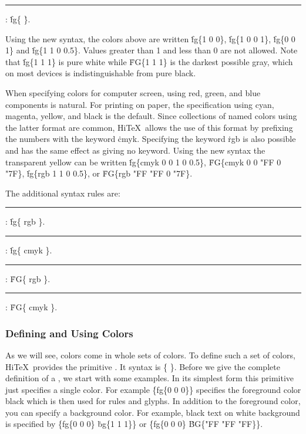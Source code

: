 \medskip
\rule{}:
\.{fg\{}     \.{\}}.
\medskip

Using the new syntax, the colors above are written
\.{fg\{1 0 0\}}, \.{fg\{1 0 0 1\}},
\.{fg\{0 0 1\}} and \.{fg\{1 1 0 0.5\}}.
Values greater than 1 and less than 0 are not allowed.
Note that \.{fg\{1 1 1\}} is pure white while  \.{FG\{1 1 1\}} is
the darkest possible gray, which on most devices is indistinguishable
from pure black.

When specifying colors for computer screen, using red, green, and blue
components is natural. For printing on paper, the specification using
cyan, magenta, yellow, and black is the default.
Since collections of named colors using the latter format
are common, Hi\TeX\ allows the use of this format by prefixing the numbers with
the keyword \.{cmyk}. Specifying the keyword \.{rgb} is also possible and has the
same effect as giving no keyword. Using the new syntax the transparent yellow
can be written \.{fg\{cmyk 0 0 1 0 0.5\}},  \.{FG\{cmyk 0 0 "FF 0 "7F\}},
 \.{fg\{rgb 1 1 0 0.5\}}, or \.{FG\{rgb "FF "FF 0 "7F\}}.

The additional syntax rules are:

\medskip
\rule{}:
\.{fg\{ rgb     \}}.
\rule{}:
\.{fg\{ cmyk      \}}.
\rule{}:
   \.{FG\{ rgb     \}}.
\rule{}:
   \.{FG\{ cmyk      \}}.
\medskip

\subsubsection{Defining and Using Colors}
As we will see, colors come in whole sets of colors.
To define such a set of colors, Hi\TeX\ provides
the primitive . It syntax is
\medskip
\prim{} \.{\{  \}}.
\medskip
Before we give the complete definition of a  ,
we start with some examples.
In its simplest form this primitive just specifies a single color.
For example \.{\{fg\{0 0 0\}\}} specifies
the foreground color black which is then used for rules and glyphs.
In addition to the foreground color, you can specify a background color.
For example, black text on white background is specified by
\.{\{fg\{0 0 0\}} \.{bg\{1 1 1\}\}} or
\.{\{fg\{0 0 0\}} \.{BG\{"FF "FF "FF\}\}}.

